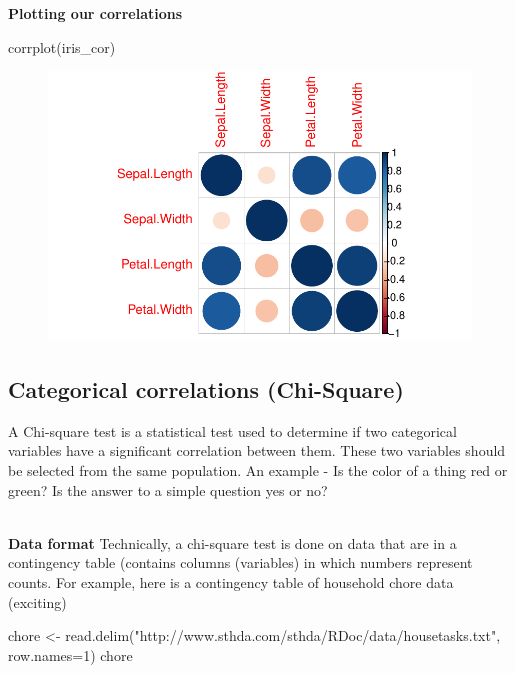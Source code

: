 \documentclass[
  letterpaper,
  DIV=11,
  numbers=noendperiod]{scrartcl}
\newenvironment{Shaded}{\begin{snugshade}}{\end{snugshade}}
\newcommand{\AttributeTok}[1]{\textcolor[rgb]{0.40,0.45,0.13}{#1}}
\newcommand{\DecValTok}[1]{\textcolor[rgb]{0.68,0.00,0.00}{#1}}
\newcommand{\FunctionTok}[1]{\textcolor[rgb]{0.28,0.35,0.67}{#1}}
\newcommand{\NormalTok}[1]{\textcolor[rgb]{0.00,0.23,0.31}{#1}}
\newcommand{\OtherTok}[1]{\textcolor[rgb]{0.00,0.23,0.31}{#1}}
\newcommand{\StringTok}[1]{\textcolor[rgb]{0.13,0.47,0.30}{#1}}
\begin{document}
\textbf{Plotting our correlations}

\begin{Shaded}
\begin{Highlighting}[]
\FunctionTok{corrplot}\NormalTok{(iris\_cor)}
\end{Highlighting}
\end{Shaded}

\begin{figure}[H]

{\centering \includegraphics{cor_reg_chi_files/figure-pdf/unnamed-chunk-7-1.pdf}

}

\end{figure}

\subsection{Categorical correlations (Chi-Square)}

A Chi-square test is a statistical test used to determine if two
categorical variables have a significant correlation between them. These
two variables should be selected from the same population. An example -
Is the color of a thing red or green? Is the answer to a simple question
yes or no?\\
\strut \\
\textbf{Data format} Technically, a chi-square test is done on data that
are in a contingency table (contains columns (variables) in which
numbers represent counts. For example, here is a contingency table of
household chore data (exciting)

\begin{Shaded}
\begin{Highlighting}[]
\NormalTok{chore }\OtherTok{\textless{}{-}} \FunctionTok{read.delim}\NormalTok{(}\StringTok{"http://www.sthda.com/sthda/RDoc/data/housetasks.txt"}\NormalTok{, }\AttributeTok{row.names=}\DecValTok{1}\NormalTok{)}
\NormalTok{chore}
\end{Highlighting}
\end{Shaded}
\end{document}
